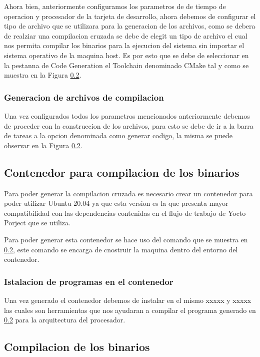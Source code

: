 Ahora bien, anteriormente configuramos los parametros de de tiempo de operacion y procesador de la tarjeta de desarrollo, ahora debemos de configurar el tipo de archivo que se utilizara para la generacion de los archivos, como se debera de realziar una compilacion cruzada se debe de elegit un tipo de archivo el cual nos permita compilar los binarios para la ejecucion del sistema sin importar el sistema operativo de la maquina host. Es por esto que se debe de seleccionar en la pestanna de Code Generation el Toolchain denominado CMake tal y como se muestra en la Figura \ref{}.


\subsubsection{Generacion de archivos de compilacion}

Una vez configurados todos los parametros mencionados anteriormente debemos de proceder con la construccion de los archivos, para esto se debe de ir a la barra de tareas a la opcion denominada como generar codigo, la misma se puede observar en la Figura \ref{}.

\subsection{Contenedor para compilacion de los binarios}

Para poder generar la compilacion cruzada es necesario crear un contenedor para poder utilizar Ubuntu 20.04 ya que esta version es la que presenta mayor compatibilidad con las dependencias contenidas en el flujo de trabajo de Yocto Porject que se utiliza. 

Para poder generar esta contenedor se hace uso del comando que se muestra en \ref{}, este comando se encarga de cnostruir la maquina dentro del entorno del contenedor. 

\subsubsection{Istalacion de programas en el contenedor}

Una vez generado el contenedor debemos de instalar en el mismo xxxxx y xxxxx las cuales son herramientas que nos ayudaran a compilar el programa generado en \ref{} para la arquitectura del procesador. 

\subsection{Compilacion de los binarios}


